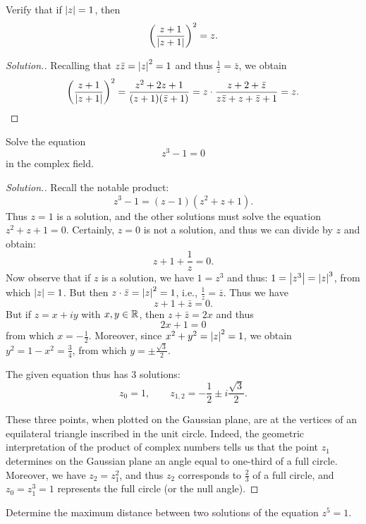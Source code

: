 \begin{exercise}[bisection]
\label{ex:bisezione}
Verify that if ${\left|z\right|}=1$, then
\[
  {\left( \frac{z+1}{{\left|z+1\right|}} \right)}^2 = z. 
\]
\end{exercise}
\begin{proof}[Solution.]
Recalling that $z \bar z = {\left|z\right|}^2 = 1$ 
and thus $\frac 1 z = \bar z$, we obtain
\[
  {\left( \frac{z+1}{{\left|z+1\right|}} \right)}^2
  = \frac{z^2+2z+1}{(z+1)(\bar z+1)}
  = z\cdot \frac{z + 2 + \bar z} {z\bar z + z + \bar z + 1}
  =z.
\]
\end{proof}

\begin{exercise}
Solve the equation 
\[ 
 z^3 - 1 = 0
\]
in the complex field.
\end{exercise}
%
\begin{proof}[Solution.]
Recall the notable product:
\[
  z^3 - 1 = (z-1)(z^2+z+1).
\]
Thus $z=1$ is a solution, and the other solutions must solve 
the equation $z^2+z+1=0$. 
Certainly, $z=0$ is not a solution, and thus we can divide by $z$ 
and obtain:
\[
  z + 1 + \frac 1 z = 0.
\]
Now observe that if $z$ is a solution, we have $1=z^3$
and thus: $1 = {\left|z^3\right|}= {\left|z\right|}^3$, from which ${\left|z\right|} = 1$.
But then $z\cdot \bar z = {\left|z\right|}^2 = 1$, i.e., $\frac 1 z = \bar z$.
Thus we have 
\[
    z + 1 + \bar z = 0.
\]
But if $z=x+iy$ with $x,y\in {\mathbb R}$, then $z+\bar z = 2x$
and thus 
\[
    2x + 1 = 0 
\]
from which $x=-\frac 1 2$. Moreover, since $x^2+y^2={\left|z\right|}^2=1$, we obtain
$y^2 = 1-x^2 = \frac 3 4$, from which $y=\pm \frac{\sqrt 3}{2}$.

The given equation thus has $3$ solutions:
\[
z_0 = 1, \qquad 
z_{1,2} = -\frac 1 2 \pm i \frac{\sqrt 3} 2.
\]

These three points, when plotted on the Gaussian plane, are 
at the vertices of an equilateral triangle inscribed in the unit circle.
Indeed, the geometric interpretation of the product of complex numbers tells us 
that the point $z_1$ determines on the Gaussian plane an angle equal 
to one-third of a full circle. Moreover, we have $z_2 = z_1^2$, and thus 
$z_2$ corresponds to $\frac 2 3$ of a full circle, and $z_0=z_1^3 = 1$
represents
the full circle (or the null angle).
\end{proof}

\begin{exercise}
Determine the maximum distance between two solutions 
of the equation $z^5=1$. 
\end{exercise}

